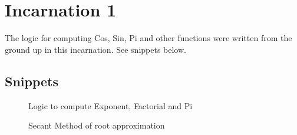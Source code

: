 \section{Incarnation 1}
  \begin{flushleft}
    The logic for computing Cos, Sin, Pi and other functions were written from the ground up in this incarnation. See snippets below.
  \end{flushleft}
  \subsection{Snippets}
  \vspace{2em}
    \begin{figure}[h!]
      \centering
      \caption{Logic to compute Exponent, Factorial and Pi}
      \label{fig:Math Library}
    \end{figure}
    \pagebreak
    \begin{figure}[h!]
      \centering
      \caption{Secant Method of root approximation}
      \label{fig:Root Approximation}
    \end{figure}

